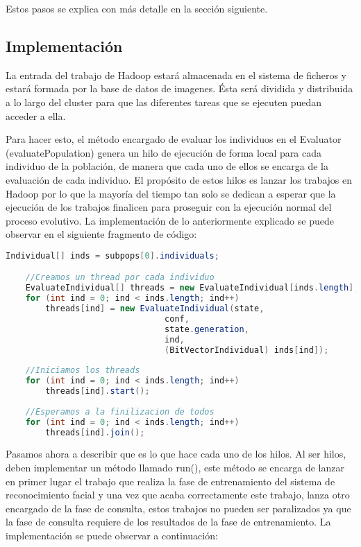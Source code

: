 Estos pasos se explica con m\'as detalle en la secci\'on siguiente.

\subsection{Implementaci\'on} \label{problema-facerecognition-implementacion}

La entrada del trabajo de Hadoop estar\'a almacenada en el sistema de ficheros y estar\'a formada por la base de datos de imagenes. \'Esta ser\'a dividida y distribuida a lo largo del cluster para que las diferentes tareas que se ejecuten puedan acceder a ella.

Para hacer esto, el método encargado de evaluar los individuos en el Evaluator (evaluatePopulation) genera un hilo de ejecución de forma local para cada individuo de la poblaci\'on, de manera que cada uno de ellos se encarga de la evaluación de cada individuo. El propósito de estos hilos es lanzar los trabajos en Hadoop por lo que la mayoría del tiempo tan solo se dedican a esperar que la ejecución de los trabajos finalicen para proseguir con la ejecución normal del proceso evolutivo. La implementación de lo anteriormente explicado se puede observar en el siguiente fragmento de código:

\begin{lstlisting}[language=Java]
	Individual[] inds = subpops[0].individuals;

	//Creamos un thread por cada individuo
	EvaluateIndividual[] threads = new EvaluateIndividual[inds.length];
	for (int ind = 0; ind < inds.length; ind++)
		threads[ind] = new EvaluateIndividual(state, 
								conf, 
								state.generation, 
								ind, 
								(BitVectorIndividual) inds[ind]);
			
	//Iniciamos los threads
	for (int ind = 0; ind < inds.length; ind++)
		threads[ind].start();
			
	//Esperamos a la finilizacion de todos
	for (int ind = 0; ind < inds.length; ind++)
		threads[ind].join();
\end{lstlisting}

Pasamos ahora a describir que es lo que hace cada uno de los hilos. Al ser hilos, deben implementar un m\'etodo llamado run(), este método se encarga de lanzar en primer lugar el trabajo que realiza la fase de entrenamiento del sistema de reconocimiento facial y una vez que acaba correctamente este trabajo, lanza otro encargado de la fase de consulta, estos trabajos no pueden ser paralizados ya que la fase de consulta requiere de los resultados de la fase de entrenamiento. La implementación se puede observar a continuación:

